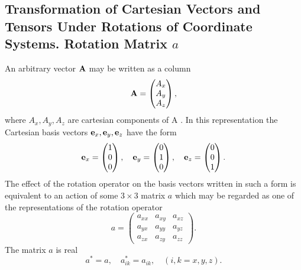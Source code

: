 \subsection{Transformation of Cartesian Vectors and Tensors Under Rotations of Coordinate Systems. Rotation Matrix $a$}\label{sec:1.4.6}
An arbitrary vector \(\mathbf{A}\) may be written as a column
\begin{equation}
\mathbf{A}=\begin{pmatrix}
A_{x}  \label{eq:1:4:37}\\
A_{y} \\
A_{z}
\end{pmatrix},
\end{equation}
where \(A_{x}, A_{y}, A_{z}\) are cartesian components of A . In this representation the Cartesian basis vectors \(\mathbf{e}_{x}, \mathbf{e}_{y}, \mathbf{e}_{z}\) have the form
\begin{equation}
\mathbf{e}_{x}=\begin{pmatrix}
1  \label{eq:1:4:38}\\
0 \\
0
\end{pmatrix}, \quad \mathbf{e}_{y}=\begin{pmatrix}
0 \\
1 \\
0
\end{pmatrix}, \quad \mathbf{e}_{z}=\begin{pmatrix}
0 \\
0 \\
1
\end{pmatrix}.
\end{equation}
The effect of the rotation operator on the basis vectors written in such a form is equivalent to an action of some \(3 \times 3\) matrix \(a\) which may be regarded as one of the representations of the rotation operator
\begin{equation}
a=\begin{pmatrix}
a_{x x} & a_{x y} & a_{x z}  \label{eq:1:4:39}\\
a_{y x} & a_{y y} & a_{y z} \\
a_{z x} & a_{z y} & a_{z z}
\end{pmatrix} .
\end{equation}
The matrix \(a\) is real
\begin{equation}
a^{*}=a, \quad a_{i k}^{*}=a_{i k}, \quad(i, k=x, y, z) . \label{eq:1:4:40}
\end{equation}
